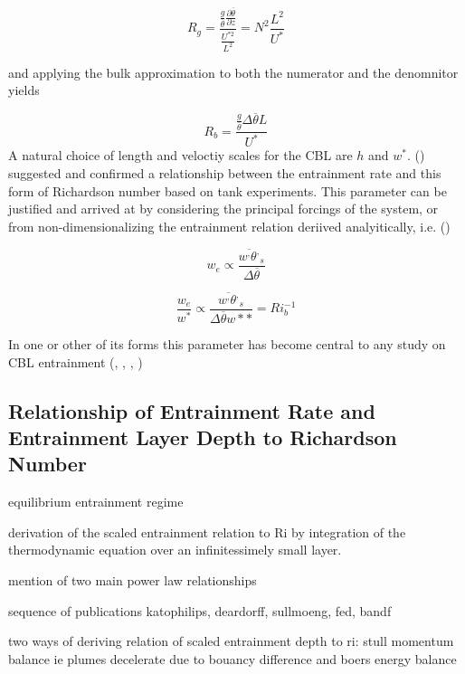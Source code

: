 \begin{equation}
R_{g} = \frac{\frac{g}{\overline{\theta}} \frac{\partial \overline{\theta}}{\partial z}}{\frac{U^{*2}}{L^{2}}} = N^{2}\frac{L^{2}}{U^{*}}
\end{equation}


and applying the bulk approximation to both the numerator and the denomnitor yields

\begin{equation}
R_{b} = \frac{\frac{g}{\overline{\theta}} \Delta \overline{\theta} L}{U^{*}}
\end{equation}
A natural choice of length and veloctiy scales for the \acs{CBL} are $h$ and $w^{*}$.  \citeauthor{EllTurn} (\cite{EllTurn}) suggested and confirmed a relationship between the entrainment rate and this form of 
Richardson number based on tank experiments.  This parameter can be justified and arrived at by considering the principal forcings of the system, or from non-dimensionalizing the entrainment relation  deriived
analyitically, i.e. (\cite{Deardorff72})

\begin{equation}
w_{e} \propto \frac{\overline{w^{,}\theta^{,}}_{s}}{\Delta \overline{\theta}}
\end{equation}

\begin{equation}
\frac{w_{e}}{w^{*}} \propto  \frac{\overline{w^{,}\theta^{,}}_{s}}{\Delta \overline{\theta} w*{*}} = Ri_{b}^{-1}
\end{equation}
 

In one or other of its forms this parameter has become central to any study on \acs{CBL} entrainment (\cite{SullMoengStev}, \cite{FedConzMir04}, \cite{Traum11}, \cite{BrooksFowler2})


\subsection{Relationship of Entrainment Rate and Entrainment Layer Depth to Richardson Number}

equilibrium entrainment regime

derivation of the scaled entrainment relation to Ri by integration of the thermodynamic equation over an infinitessimely small layer.

mention of two main power law relationships

sequence of publications katophilips, deardorff, sullmoeng, fed, bandf

two ways of deriving relation of scaled entrainment depth to ri: stull momentum balance ie plumes decelerate due to bouancy difference
and boers energy balance

